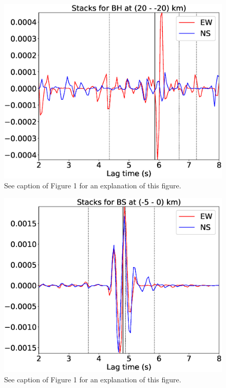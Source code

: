 \documentclass[letterpaper, 12pt]{article}
\begin{document}
\begin{figure}[H]
\includegraphics[width=\linewidth]{figures/intervals/BH_020_-20_stacks.eps}
\caption{See caption of Figure 1 for an explanation of this figure.}
\end{figure}

\begin{figure}[H]
\includegraphics[width=\linewidth]{figures/intervals/BS_-05_000_stacks.eps}
\caption{See caption of Figure 1 for an explanation of this figure.}
\end{figure}
\end{document}

